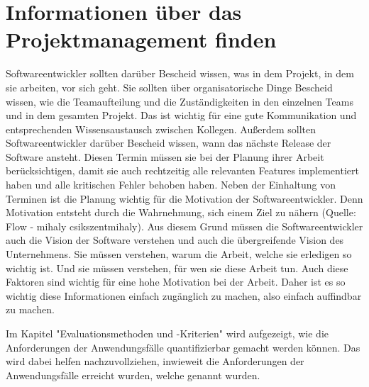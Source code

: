 \section{Informationen über das Projektmanagement finden}
Softwareentwickler sollten darüber Bescheid wissen, was in dem Projekt, in dem sie arbeiten, vor sich geht.
Sie sollten über organisatorische Dinge Bescheid wissen, wie die Teamaufteilung und die Zuständigkeiten in den einzelnen Teams und in dem gesamten Projekt.
Das ist wichtig für eine gute Kommunikation und entsprechenden Wissensaustausch zwischen Kollegen.
Außerdem sollten Softwareentwickler darüber Bescheid wissen, wann das nächste Release der Software ansteht.
Diesen Termin müssen sie bei der Planung ihrer Arbeit berücksichtigen, damit sie auch rechtzeitig alle relevanten Features implementiert haben und alle kritischen Fehler behoben haben.
Neben der Einhaltung von Terminen ist die Planung wichtig für die Motivation der Softwareentwickler.
Denn Motivation entsteht durch die Wahrnehmung, sich einem Ziel zu nähern (Quelle: Flow - mihaly csikszentmihaly).
Aus diesem Grund müssen die Softwareentwickler auch die Vision der Software verstehen und auch die übergreifende Vision des Unternehmens.
Sie müssen verstehen, warum die Arbeit, welche sie erledigen so wichtig ist.
Und sie müssen verstehen, für wen sie diese Arbeit tun.
Auch diese Faktoren sind wichtig für eine hohe Motivation bei der Arbeit.
Daher ist es so wichtig diese Informationen einfach zugänglich zu machen, also einfach auffindbar zu machen.

Im Kapitel "Evaluationsmethoden und -Kriterien" wird aufgezeigt, wie die Anforderungen der Anwendungsfälle quantifizierbar gemacht werden können.
Das wird dabei helfen nachzuvollziehen, inwieweit die Anforderungen der Anwendungsfälle erreicht wurden, welche genannt wurden.
